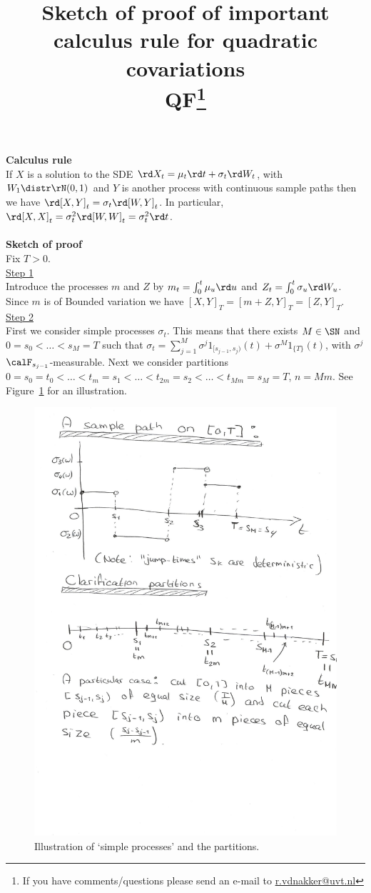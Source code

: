 \documentclass{article}
\title{Sketch of proof of important calculus rule for quadratic covariations \\ QF\footnote{If you have comments/questions please send an e-mail
to \textcolor{blue}{\href{mailto:r.vdnakker@uvt.nl}{r.vdnakker@uvt.nl}} } }
\date{ }
\begin{document}
\maketitle
\noindent
\textbf{Calculus rule} \\
If $X$ is a solution to the SDE $\rd X_t=\mu_t \rd t + \sigma_t \rd W_t$, with $W_1\distr \rN(0,1)$ 
and $Y$ is another process with continuous sample paths then we have $\rd [X,Y]_t=\sigma_t \rd [W,Y]_t$. In particular,
$\rd [X,X]_t=\sigma_t^2 \rd [W,W]_t=\sigma_t^2 \rd t$.
\\ \\
\textbf{Sketch of proof} \\
Fix $T>0$. \\
\underline{Step 1} \\
Introduce the processes $m$ and $Z$ by $m_t=\int_0^t \mu_u \rd u$ and $Z_t=\int_0^t \sigma_u \rd W_u$. Since $m$ is of Bounded variation we have
$[X,Y]_T=[m+Z,Y]_T=[Z,Y]_T$. \\
\underline{Step 2} \\
First we consider simple processes $\sigma_t$. This means that there exists $M\in\SN$ and $0=s_0<\dots<s_M=T$
such that $\sigma_t=\sum_{j=1}^M \sigma^j 1_{[s_{j-1},s_j)}(t)+\sigma^M 1_{\{T\}}(t)$, with $\sigma^j$ $\calF_{s_{j-1}}$-measurable.
Next we consider partitions $0=s_0=t_0<\dots<t_m=s_1<\dots<t_{2m}=s_2<\dots<t_{Mm}=s_M=T$, $n=Mm$. See Figure~\ref{fig} for an illustration.
\begin{figure}
\begin{center}
\includegraphics[height=0.85\textwidth]{Scan.jpg}
\caption{Illustration of `simple processes'  and the partitions.}\label{fig}
\end{center}
\end{figure}
\end{document}
